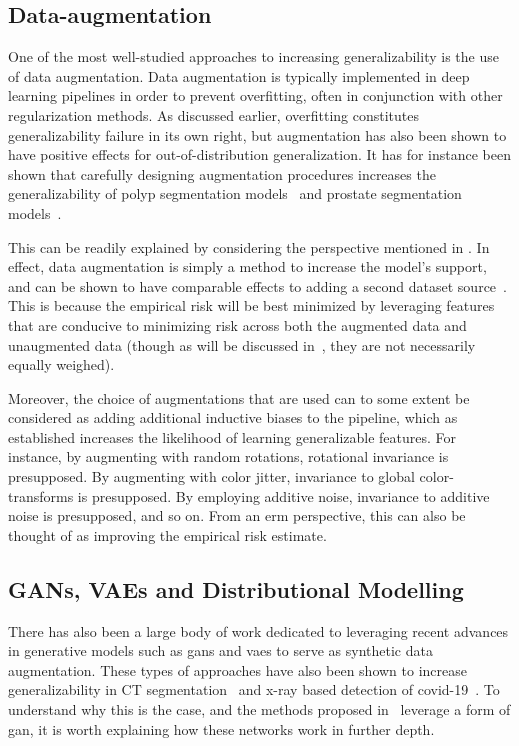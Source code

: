 \subsection{Data-augmentation}
One of the most well-studied approaches to increasing generalizability is the use of data augmentation. Data augmentation is typically
implemented in deep learning pipelines in order to prevent overfitting, often in conjunction with other regularization methods. As discussed earlier, overfitting constitutes generalizability failure in its own right, but augmentation has also been shown to have positive effects for out-of-distribution generalization. It has for instance been shown that carefully designing augmentation procedures increases the generalizability of polyp segmentation models~\cite{polyp_augmentation} and prostate segmentation models~\cite{augmentation_prostate}. 

This can be readily explained by considering the perspective mentioned in . In effect, data augmentation is simply a method to increase the model's support, and can be shown to have comparable effects to adding a second dataset source~\cite{generalization_datamod}. This is because the empirical risk will be best minimized by leveraging features that are conducive to minimizing risk across both the augmented data and unaugmented data (though as will be discussed in~, they are not necessarily equally weighed). 

Moreover, the choice of augmentations that are used can to some extent be considered as adding additional inductive biases to the pipeline, which as established increases the likelihood of learning generalizable features. For instance, by augmenting with random rotations, rotational invariance is presupposed. By augmenting with color jitter, invariance to global color-transforms is presupposed.  By employing additive noise, invariance to additive noise is presupposed, and so on. From an \gls{erm} perspective, this can also be thought of as improving the empirical risk estimate. 

\subsection{GANs, VAEs and Distributional Modelling}

There has also been a large body of work dedicated to leveraging recent advances in generative models such as \glspl{gan} and \glspl{vae} to serve as synthetic data augmentation. These types of approaches have also been shown to increase generalizability in CT segmentation~\cite{cyclegan} and x-ray based detection of covid-19~\cite{covid}. To understand why this is the case, and the methods proposed in~ leverage a form of \gls{gan}, it is worth explaining how these networks work in further depth.
